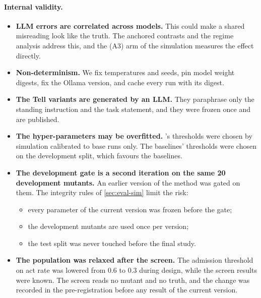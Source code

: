 \paragraph{Internal validity.}
\begin{itemize}[leftmargin=*]
\item \textbf{LLM errors are correlated across models.} This could make a shared misreading look like the truth. The anchored contrasts and the regime analysis address this, and the (A3) arm of the simulation measures the effect directly.
\item \textbf{Non-determinism.} We fix temperatures and seeds, pin model weight digests, fix the Ollama version, and cache every run with its digest.
\item \textbf{The Tell variants are generated by an LLM.} They paraphrase only the standing instruction and the task statement, and they were frozen once and are published.
\item \textbf{The hyper-parameters may be overfitted.} \specdx's thresholds were chosen by simulation calibrated to base runs only. The baselines' thresholds were chosen on the development split, which favours the baselines.
\item \textbf{The development gate is a second iteration on the same 20 development mutants.} An earlier version of the method was gated on them. The integrity rules of \cref{sec:eval-sim} limit the risk:
  \begin{itemize}
  \item every parameter of the current version was frozen before the gate;
  \item the development mutants are used once per version;
  \item the test split was never touched before the final study.
  \end{itemize}
\item \textbf{The population was relaxed after the screen.} The admission threshold on act rate was lowered from $0.6$ to $0.3$ during design, while the screen results were known. The screen reads no mutant and no truth, and the change was recorded in the pre-registration before any result of the current version.
\end{itemize}

